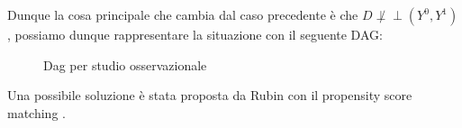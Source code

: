 \documentclass{article}
\begin{document}
Dunque la cosa principale che cambia dal caso precedente è che $D \not \perp\!\!\!\perp (Y^{0},Y^{1})$, possiamo dunque rappresentare la situazione con il seguente DAG:
\begin{figure}[!h]
\centering
\caption{Dag per studio osservazionale}
\label{fig:dag_OBS}
\end{figure}

Una possibile soluzione è stata proposta da Rubin con il propensity score matching .














\nocite{*} 
\end{document}
